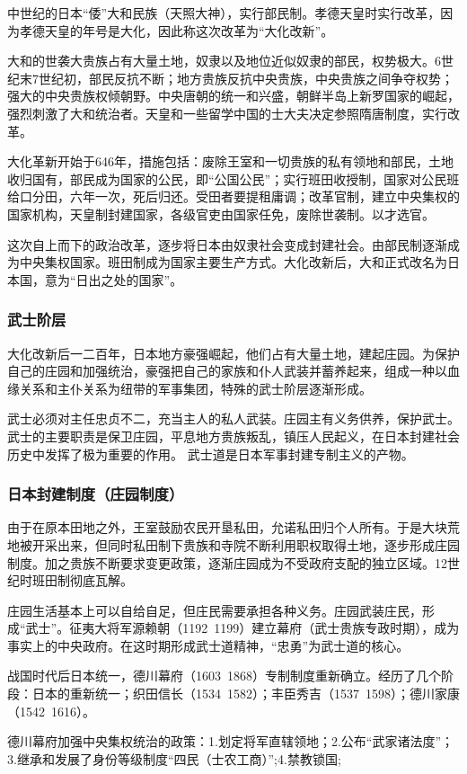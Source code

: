 中世纪的日本“倭”大和民族（天照大神），实行部民制。孝德天皇时实行改革，因为孝德天皇的年号是大化，因此称这次改革为“大化改新”。

大和的世袭大贵族占有大量土地，奴隶以及地位近似奴隶的部民，权势极大。6世纪末7世纪初，部民反抗不断；地方贵族反抗中央贵族，中央贵族之间争夺权势；强大的中央贵族权倾朝野。中央唐朝的统一和兴盛，朝鲜半岛上新罗国家的崛起，强烈刺激了大和统治者。天皇和一些留学中国的士大夫决定参照隋唐制度，实行改革。

大化革新开始于646年，措施包括：废除王室和一切贵族的私有领地和部民，土地收归国有，部民成为国家的公民，即“公国公民”；实行班田收授制，国家对公民班给口分田，六年一次，死后归还。受田者要提租庸调；改革官制，建立中央集权的国家机构，天皇制封建国家，各级官吏由国家任免，废除世袭制。以才选官。

这次自上而下的政治改革，逐步将日本由奴隶社会变成封建社会。由部民制逐渐成为中央集权国家。班田制成为国家主要生产方式。大化改新后，大和正式改名为日本国，意为“日出之处的国家”。

\subsubsection{武士阶层}
大化改新后一二百年，日本地方豪强崛起，他们占有大量土地，建起庄园。为保护自己的庄园和加强统治，豪强把自己的家族和仆人武装并蓄养起来，组成一种以血缘关系和主仆关系为纽带的军事集团，特殊的武士阶层逐渐形成。

武士必须对主任忠贞不二，充当主人的私人武装。庄园主有义务供养，保护武士。武士的主要职责是保卫庄园，平息地方贵族叛乱，镇压人民起义，在日本封建社会历史中发挥了极为重要的作用。
武士道是日本军事封建专制主义的产物。

\subsubsection{日本封建制度（庄园制度）}
由于在原本田地之外，王室鼓励农民开垦私田，允诺私田归个人所有。于是大块荒地被开采出来，但同时私田制下贵族和寺院不断利用职权取得土地，逐步形成庄园制度。加之贵族不断要求变更政策，逐渐庄园成为不受政府支配的独立区域。12世纪时班田制彻底瓦解。

庄园生活基本上可以自给自足，但庄民需要承担各种义务。庄园武装庄民，形成“武士”。征夷大将军源赖朝（1192~1199）建立幕府（武士贵族专政时期），成为事实上的中央政府。在这时期形成武士道精神，“忠勇”为武士道的核心。

战国时代后日本统一，德川幕府（1603~1868）专制制度重新确立。经历了几个阶段：日本的重新统一；织田信长（1534~1582）；丰臣秀吉（1537~1598）；德川家康（1542~1616）。

德川幕府加强中央集权统治的政策：1.划定将军直辖领地；2.公布“武家诸法度”；3.继承和发展了身份等级制度“四民（士农工商）”;4.禁教锁国;

